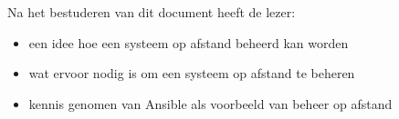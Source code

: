 Na het bestuderen van dit document heeft de lezer:
\begin{itemize}
\item een idee hoe een systeem op afstand beheerd kan worden
\item wat ervoor nodig is om een systeem op afstand te beheren
\item kennis genomen van Ansible als voorbeeld van beheer op afstand
\end{itemize}
